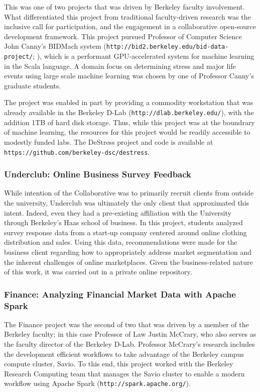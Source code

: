 \documentclass[12pt]{article}
\begin{document}
This was one of two projects that was driven by Berkeley faculty involvement. What differentiated this project from traditional faculty-driven research was the inclusive call for participation, and the engagement in a collaborative open-source development framework. This project pursued Professor of Computer Science John Canny's BIDMach system (\texttt{http://bid2.berkeley.edu/bid-data-project/}; \cite{canny2013bidmach}), which is a performant GPU-accelerated system for machine learning in the Scala language. A domain focus on determining stress and major life events using large scale machine learning was chosen by one of Professor Canny's graduate students.

The project was enabled in part by providing a commodity workstation that was already available in the Berkeley D-Lab (\texttt{http://dlab.berkeley.edu/}), with the addition 1TB of hard disk storage. Thus, while this project was at the boundrary of machine learning, the resources for this project would be readily accessible to modestly funded labs.  The DeStress project and code is available at \texttt{https://github.com/berkeley-dsc/destress}.

\subsubsection*{Underclub: Online Business Survey Feedback}

While intention of the Collaborative was to primarily recruit clients from outside the university, Underclub was ultimately the only client that approximated this intent. Indeed, even they had a pre-existing affiliation with the University through Berkeley's Haas school of business.  In this project, students analyzed survey response data from a start-up company centered around online clothing distribution and sales.  Using this data, recommendations were made for the business client regarding how to appropriately address market segmentation and the inherent challenges of online marketplaces.  Given the business-related nature of this work, it was carried out in a private online repository.

\subsubsection*{Finance: Analyzing Financial Market Data with Apache Spark}

The Finance project was the second of two that was driven by a member of the Berkeley faculty; in this case Professor of Law Justin McCrary, who also serves as the faculty director of the Berkeley D-Lab. Professor McCrary's research includes the development efficient workflows to take advantage of the Berkeley campus compute cluster, Savio. To this end, this project worked with the Berkeley Research Computing team that manages the Savio cluster to enable a modern workflow using Apache Spark (\texttt{http://spark.apache.org/}).
\end{document}
